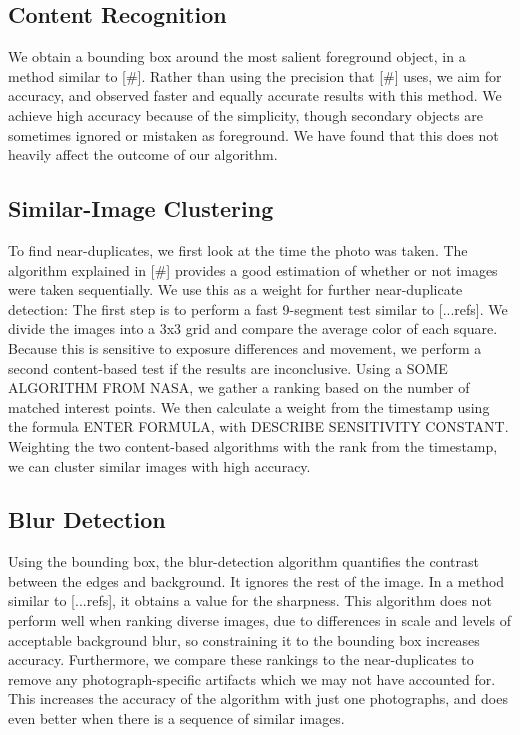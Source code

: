 \documentclass[twocolumn]{article}
\begin{document}
\subsection{Content Recognition}
We obtain a bounding box around the most salient foreground object, in a method similar to [\#]. Rather than using the precision that [\#] uses, we aim for accuracy, and observed faster and equally accurate results with this method. We achieve high accuracy because of the simplicity, though secondary objects are sometimes ignored or mistaken as foreground. We have found that this does not heavily affect the outcome of our algorithm.
\subsection{Similar-Image Clustering}
To find near-duplicates, we first look at the time the photo was taken. The algorithm explained in [\#] provides a good estimation of whether or not images were taken sequentially. We use this as a weight for further near-duplicate detection:
The first step is to perform a fast 9-segment test similar to [...refs]. We divide the images into a 3x3 grid and compare the average color of each square. Because this is sensitive to exposure differences and movement, we perform a second content-based test if the results are inconclusive. Using a SOME ALGORITHM FROM NASA, we gather a ranking based on the number of matched interest points.
We then calculate a weight from the timestamp using the formula ENTER FORMULA, with DESCRIBE SENSITIVITY CONSTANT.
Weighting the two content-based algorithms with the rank from the timestamp, we can cluster similar images with high accuracy. 
         
\subsection{Blur Detection}
Using the bounding box, the blur-detection algorithm quantifies the contrast between the edges and background. It ignores the rest of the image. In a method similar to [...refs], it obtains a value for the sharpness. This algorithm does not perform well when ranking diverse images, due to differences in scale and levels of acceptable background blur, so constraining it to the bounding box increases accuracy. Furthermore, we compare these rankings to the near-duplicates to remove any photograph-specific artifacts which we may not have accounted for. This increases the accuracy of the algorithm with just one photographs, and does even better when there is a sequence of similar images.
\end{document}
